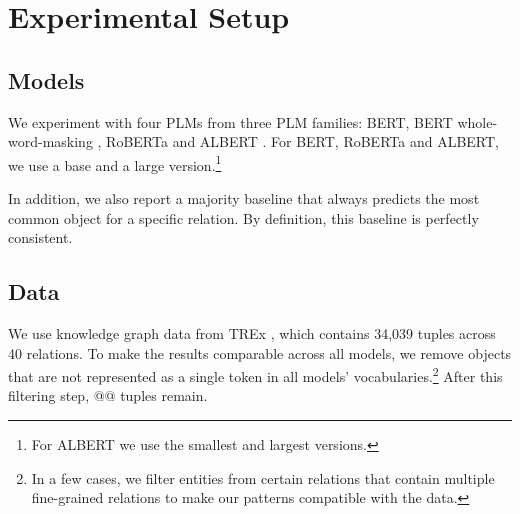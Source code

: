 \section{Experimental Setup}
\label{sec:setup}

\subsection{Models}
We experiment with four PLMs
from three PLM families: BERT, BERT whole-word-masking
\cite{bert}, RoBERTa \cite{roberta} and ALBERT
\cite{albert}. For BERT, RoBERTa and ALBERT, we use a base and a large version.\footnote{For ALBERT we use the smallest and largest versions.}


In addition, we also report a majority baseline that always predicts the most common object for a specific relation. By definition, this baseline is perfectly consistent.

\subsection{Data}
\label{setupdata}


We use knowledge graph data from TREx \cite{trex}, which
contains 34,039 tuples across 40 relations. To make the
results comparable across all models, we remove objects that
are not represented as a single token in all models'
vocabularies.\footnote{In a few cases, we filter entities from certain relations that contain multiple fine-grained relations to make our patterns compatible with the data.}
After this filtering step, @@ tuples remain.

